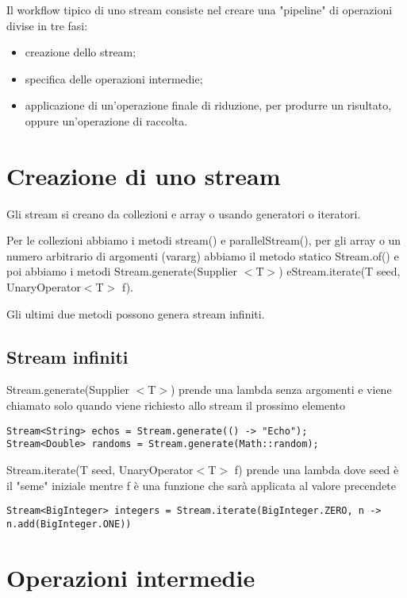 Il workflow tipico di uno stream consiste nel creare una "pipeline" di operazioni divise in tre fasi:
\begin{itemize}
    \item creazione dello stream;
    \item specifica delle operazioni intermedie;
    \item applicazione di un’operazione finale di riduzione, per produrre un risultato, oppure un'operazione di raccolta.
\end{itemize}

\section{Creazione di uno stream}

Gli stream si creano da collezioni e array o usando generatori o iteratori.
\smallskip

Per le collezioni abbiamo i metodi stream() e parallelStream(), per gli array o un numero arbitrario di argomenti (vararg) abbiamo il metodo statico Stream.of() 
e poi abbiamo i metodi Stream.generate(Supplier $<$T$>$) e\newline Stream.iterate(T seed, UnaryOperator$<$T$>$ f).

Gli ultimi due metodi possono genera stream infiniti.

\subsection{Stream infiniti}
Stream.generate(Supplier $<$T$>$) prende una lambda senza argomenti e viene chiamato solo quando viene richiesto allo stream il prossimo elemento
\begin{lstlisting}
Stream<String> echos = Stream.generate(() -> "Echo");
Stream<Double> randoms = Stream.generate(Math::random); 
\end{lstlisting}

Stream.iterate(T seed, UnaryOperator$<$T$>$ f) prende una lambda dove seed è il "seme" iniziale mentre f è una funzione che sarà applicata al valore precendete
\begin{lstlisting}
Stream<BigInteger> integers = Stream.iterate(BigInteger.ZERO, n -> n.add(BigInteger.ONE))   
\end{lstlisting}

\section{Operazioni intermedie}

